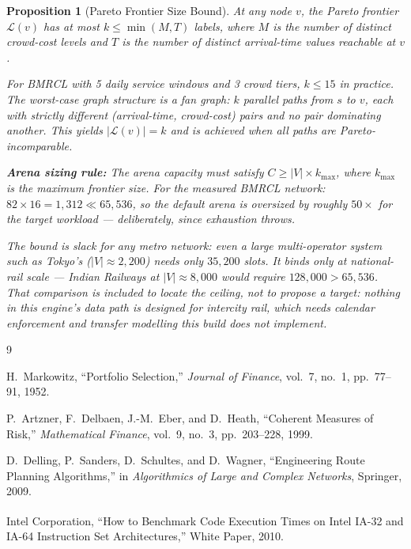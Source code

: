 \documentclass[11pt, a4paper]{article}
\newtheorem{proposition}[theorem]{Proposition}
\theoremstyle{remark}
\begin{document}
\begin{proposition}[Pareto Frontier Size Bound]
    \label{prop:frontier-bound}
    At any node $v$, the Pareto frontier $\mathcal{L}(v)$ has at most
    $k \le \min(M, T)$ labels, where $M$ is the number of distinct
    crowd-cost levels and $T$ is the number of distinct arrival-time values
    reachable at $v$.

    For BMRCL with 5 daily service windows and 3 crowd tiers, $k \le 15$
    in practice. The worst-case graph structure is a \emph{fan graph}: $k$
    parallel paths from $s$ to $v$, each with strictly different
    (arrival-time, crowd-cost) pairs and no pair dominating another. This
    yields $|\mathcal{L}(v)| = k$ and is achieved when all paths are
    Pareto-incomparable.

    \textbf{Arena sizing rule:} The arena capacity must satisfy
    $C \ge |V| \times k_{\max}$, where $k_{\max}$ is the maximum frontier
    size. For the measured BMRCL network: $82 \times 16 = 1{,}312 \ll 65{,}536$,
    so the default arena is oversized by roughly $50\times$ for the target
    workload --- deliberately, since exhaustion throws.

    The bound is slack for \emph{any} metro network: even a large multi-operator
    system such as Tokyo's ($|V| \approx 2{,}200$) needs only $35{,}200$ slots.
    It binds only at national-rail scale --- Indian Railways at
    $|V| \approx 8{,}000$ would require $128{,}000 > 65{,}536$. That comparison is
    included to locate the ceiling, not to propose a target: nothing in this
    engine's data path is designed for intercity rail, which needs calendar
    enforcement and transfer modelling this build does not implement.
\end{proposition}


\begin{thebibliography}{9}

H.~Markowitz,
``Portfolio Selection,''
\textit{Journal of Finance}, vol.~7, no.~1, pp.~77--91, 1952.

P.~Artzner, F.~Delbaen, J.-M.~Eber, and D.~Heath,
``Coherent Measures of Risk,''
\textit{Mathematical Finance}, vol.~9, no.~3, pp.~203--228, 1999.

D.~Delling, P.~Sanders, D.~Schultes, and D.~Wagner,
``Engineering Route Planning Algorithms,''
in \textit{Algorithmics of Large and Complex Networks}, Springer, 2009.

Intel Corporation,
``How to Benchmark Code Execution Times on Intel\textsuperscript{\textregistered}
IA-32 and IA-64 Instruction Set Architectures,''
White Paper, 2010.

\end{thebibliography}
\end{document}
